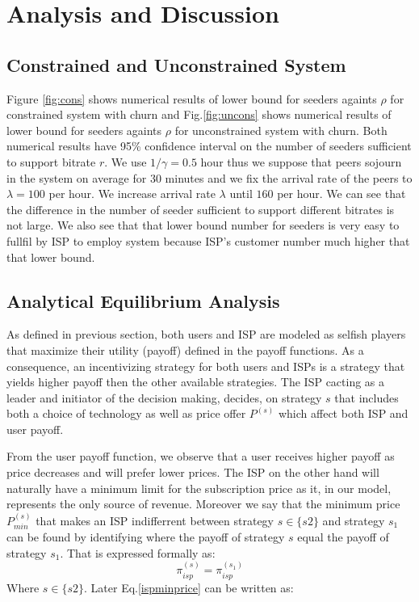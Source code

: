 \documentclass[paper]{ieice}
\begin{document}
\section{Analysis and Discussion}

\subsection{Constrained and Unconstrained System}

Figure \ref{fig:cons} shows numerical results of lower bound for seeders againts $\rho$ for constrained system with churn and Fig.\ref{fig:uncons} shows numerical results of lower bound for seeders againts $\rho$ for unconstrained system with churn.  
Both numerical results have 95\% confidence interval on the number of seeders sufficient to support bitrate $r$.  
We use $1/\gamma = 0.5$ hour thus we suppose that peers sojourn in the system on average for 30 minutes and we fix the arrival rate of the peers to $\lambda=100$ per hour.
We increase arrival rate $\lambda$ until $160$ per hour. 
We can see that the difference in the number of seeder sufficient to support different bitrates is not large.  
We also see that that lower bound number for seeders is very easy to fullfil by ISP to employ system because ISP's customer number much higher that that lower bound.

\subsection{Analytical Equilibrium Analysis}
As defined in previous section, both users and ISP are modeled as selfish players that maximize their utility (payoff) defined in the payoff functions.
As a consequence, an incentivizing strategy for both users and ISPs is a strategy that yields higher payoff then the other available strategies.
The ISP cacting as a leader and initiator of the decision making, decides, on strategy $s$ that includes both a choice of technology as well as price offer $P^{(s)}$ which affect both ISP and user payoff.

From the user payoff function, we observe that a user receives higher payoff as price decreases and will prefer lower prices.
The ISP on the other hand will naturally have a minimum limit for the subscription price as it, in our model, represents the only source of revenue.
Moreover we say that the minimum price $P^{(s)}_{min}$ that makes an ISP indifferrent between strategy $s \in \{s2\}$ and strategy $s_1$ can be found by identifying where the payoff of strategy $s$ equal the payoff of strategy $s_1$. 
That is expressed formally as:
\begin{equation}\label{ispminprice}
	\pi^{(s)}_{isp} = \pi^{(s_1)}_{isp}
\end{equation}
Where $s \in \{s2\}$. 
Later Eq.\ref{ispminprice} can be written as: 
\end{document}
